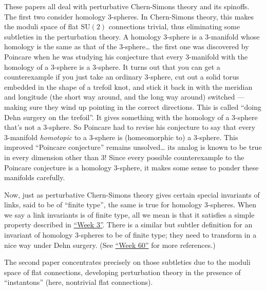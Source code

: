 \documentclass{article}
\renewcommand{\texttt}[1]{%
  \begingroup
  \ttfamily
  \begingroup\lccode`~=`/\lowercase{\endgroup\def~}{/\discretionary{}{}{}}%
  \begingroup\lccode`~=`[\lowercase{\endgroup\def~}{[\discretionary{}{}{}}%
  \begingroup\lccode`~=`.\lowercase{\endgroup\def~}{.\discretionary{}{}{}}%
  \catcode`/=\active\catcode`[=\active\catcode`.=\active
  \scantokens{#1\noexpand}%
  \endgroup
}
\begin{document}
These papers all deal with perturbative Chern-Simons theory and its
spinoffs. The first two consider homology 3-spheres. In Chern-Simons
theory, this makes the moduli space of flat \(\mathrm{SU}(2)\)
connections trivial, thus eliminating some subtleties in the
perturbation theory. A homology 3-sphere is a 3-manifold whose homology
is the same as that of the 3-sphere\ldots{} the first one was discovered
by Poincare when he was studying his conjecture that every 3-manifold
with the homology of a 3-sphere is a 3-sphere. It turns out that you can
get a counterexample if you just take an ordinary 3-sphere, cut out a
solid torus embedded in the shape of a trefoil knot, and stick it back
in with the meridian and longitude (the short way around, and the long
way around) switched --- making sure they wind up pointing in the
correct directions. This is called ``doing Dehn surgery on the
trefoil''. It gives something with the homology of a 3-sphere that's not
a 3-sphere. So Poincare had to revise his conjecture to say that every
3-manifold \emph{homotopic} to a 3-sphere is (homeomorphic to) a
3-sphere. This improved ``Poincare conjecture'' remains unsolved\ldots{}
its analog is known to be true in every dimension other than 3! Since
every possible counterexample to the Poincare conjecture is a homology
3-sphere, it makes some sense to ponder these manifolds carefully.

Now, just as perturbative Chern-Simons theory gives certain special
invariants of links, said to be of ``finite type'', the same is true for
homology 3-spheres. When we say a link invariants is of finite type, all
we mean is that it satisfies a simple property described in
\protect\hyperlink{week3}{``Week 3''}. There is a similar but subtler
definition for an invariant of homology 3-spheres to be of finite type;
they need to transform in a nice way under Dehn surgery. (See
\protect\hyperlink{week60}{``Week 60''} for more references.)

The second paper concentrates precisely on those subtleties due to the
moduli space of flat connections, developing perturbation theory in the
presence of ``instantons'' (here, nontrivial flat connections).

\end{document}
